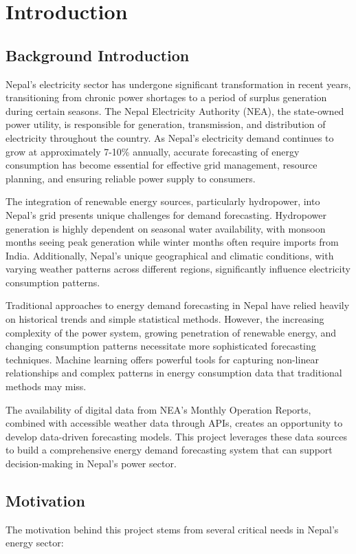 \chapter{Introduction}
    \section{Background Introduction}
        Nepal's electricity sector has undergone significant transformation in recent years, transitioning from chronic power shortages to a period of surplus generation during certain seasons. The Nepal Electricity Authority (NEA), the state-owned power utility, is responsible for generation, transmission, and distribution of electricity throughout the country. As Nepal's electricity demand continues to grow at approximately 7-10\% annually, accurate forecasting of energy consumption has become essential for effective grid management, resource planning, and ensuring reliable power supply to consumers.

        The integration of renewable energy sources, particularly hydropower, into Nepal's grid presents unique challenges for demand forecasting. Hydropower generation is highly dependent on seasonal water availability, with monsoon months seeing peak generation while winter months often require imports from India. Additionally, Nepal's unique geographical and climatic conditions, with varying weather patterns across different regions, significantly influence electricity consumption patterns.

        Traditional approaches to energy demand forecasting in Nepal have relied heavily on historical trends and simple statistical methods. However, the increasing complexity of the power system, growing penetration of renewable energy, and changing consumption patterns necessitate more sophisticated forecasting techniques. Machine learning offers powerful tools for capturing non-linear relationships and complex patterns in energy consumption data that traditional methods may miss.

        The availability of digital data from NEA's Monthly Operation Reports, combined with accessible weather data through APIs, creates an opportunity to develop data-driven forecasting models. This project leverages these data sources to build a comprehensive energy demand forecasting system that can support decision-making in Nepal's power sector.

    \pagebreak
    \section{Motivation}
        The motivation behind this project stems from several critical needs in Nepal's energy sector:

